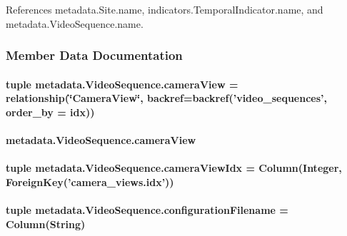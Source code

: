 References metadata.\-Site.\-name, indicators.\-Temporal\-Indicator.\-name, and metadata.\-Video\-Sequence.\-name.



\subsubsection{Member Data Documentation}
\hypertarget{classmetadata_1_1VideoSequence_a78803fa800420a7594cc5c0f03f590b2}{
\paragraph[{camera\-View}]{\setlength{\rightskip}{0pt plus 5cm}tuple metadata.\-Video\-Sequence.\-camera\-View = relationship(\char`\"{}Camera\-View\char`\"{}, backref=backref('video\-\_\-sequences', order\-\_\-by = {\bf idx}))\hspace{0.3cm}{\ttfamily [static]}}}\label{classmetadata_1_1VideoSequence_a78803fa800420a7594cc5c0f03f590b2}
\hypertarget{classmetadata_1_1VideoSequence_a86bbfba5769bee7c31e75221215578d1}{
\paragraph[{camera\-View}]{\setlength{\rightskip}{0pt plus 5cm}metadata.\-Video\-Sequence.\-camera\-View}}\label{classmetadata_1_1VideoSequence_a86bbfba5769bee7c31e75221215578d1}
\hypertarget{classmetadata_1_1VideoSequence_aaa1608c6a957289ec399e995d082b616}{
\paragraph[{camera\-View\-Idx}]{\setlength{\rightskip}{0pt plus 5cm}tuple metadata.\-Video\-Sequence.\-camera\-View\-Idx = Column(Integer, Foreign\-Key('camera\-\_\-views.\-idx'))\hspace{0.3cm}{\ttfamily [static]}}}\label{classmetadata_1_1VideoSequence_aaa1608c6a957289ec399e995d082b616}
\hypertarget{classmetadata_1_1VideoSequence_a5c35f48c9567f8bff79677448e018aac}{
\paragraph[{configuration\-Filename}]{\setlength{\rightskip}{0pt plus 5cm}tuple metadata.\-Video\-Sequence.\-configuration\-Filename = Column(String)\hspace{0.3cm}{\ttfamily [static]}}}\label{classmetadata_1_1VideoSequence_a5c35f48c9567f8bff79677448e018aac}
